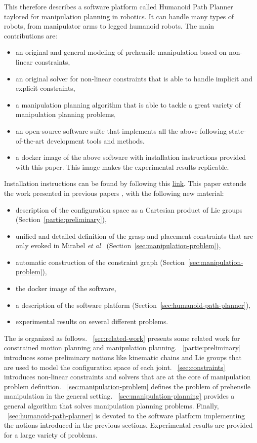 This \paper therefore describes a software platform called {Humanoid Path
  Planner} taylored for manipulation planning in robotics. It can handle many types of robots, from manipulator arms to legged humanoid robots.
The main contributions are:
\begin{itemize}
\item an original and general modeling of prehensile manipulation based on
  non-linear constraints,
\item an original solver for non-linear constraints that is able to handle implicit and explicit constraints,
\item a manipulation planning algorithm that is able to tackle a great variety of manipulation planning problems,
\item an open-source software suite that implements all the above following state-of-the-art development tools and methods.
\item a docker image of the above software with installation instructions provided with this paper. This image makes the experimental results replicable.
\end{itemize}
{\color{blue} Installation instructions can be found by following this \href{https://humanoid-path-planner.github.io/hpp-doc}{link}.}
This paper extends the work presented in {\color{blue} previous papers }\cite{mirabel-iros2016},\cite{MirLam2018} with the following new material:
\begin{itemize}
\item description of the configuration space as a Cartesian product of Lie groups (Section~\ref{partie:preliminary}),
\item unified and detailed definition of the grasp and placement constraints that are only evoked in {\color{blue}Mirabel \textit{et al}}~\cite{mirabel-iros2016} (Section~\ref{sec:manipulation-problem}),
\item automatic construction of the constraint graph (Section~\ref{sec:manipulation-problem}),
\item the docker image of the software,
\item a description of the software platform (Section~\ref{sec:humanoid-path-planner}),
\item experimental results on several different problems.
\end{itemize}

The \paper is organized as follows. \Partie~\ref{sec:related-work} presents some related work for constrained motion planning and manipulation planning.
\Partie~\ref{partie:preliminary} introduces some preliminary notions like kinematic chains and Lie groups that are used to model the configuration space of each joint. \Partie~\ref{sec:constraints} introduces non-linear constraints and solvers that are at the core of manipulation problem definition. \Partie~\ref{sec:manipulation-problem} defines the problem of prehensile manipulation in the general setting. \Partie~\ref{sec:manipulation-planning} provides a general algorithm that solves manipulation planning problems. Finally, \partie~\ref{sec:humanoid-path-planner} is devoted to the software platform implementing the notions introduced in the previous sections. Experimental results are provided for a large variety of problems.

